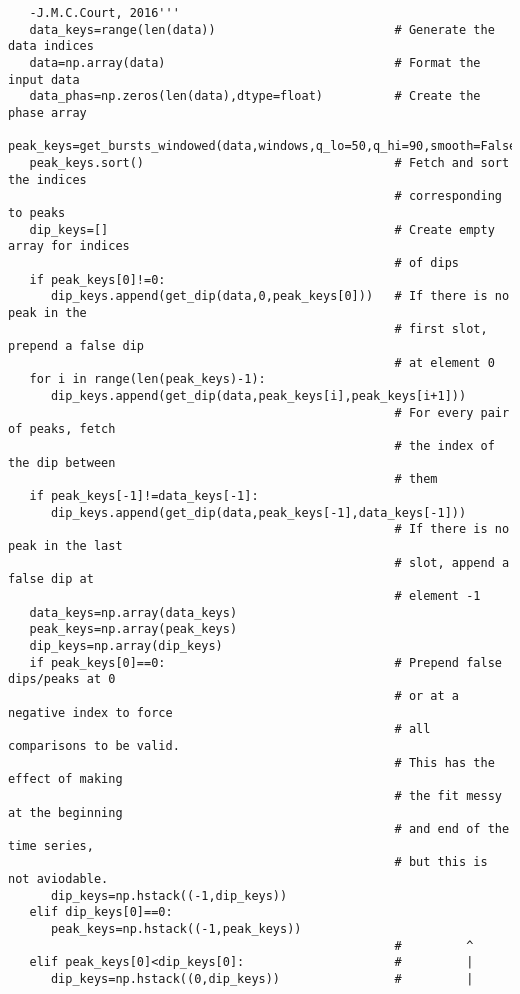 \begin{verbatim}
   -J.M.C.Court, 2016'''
   data_keys=range(len(data))                         # Generate the data indices
   data=np.array(data)                                # Format the input data
   data_phas=np.zeros(len(data),dtype=float)          # Create the phase array
   peak_keys=get_bursts_windowed(data,windows,q_lo=50,q_hi=90,smooth=False)
   peak_keys.sort()                                   # Fetch and sort the indices
                                                      # corresponding to peaks
   dip_keys=[]                                        # Create empty array for indices
                                                      # of dips
   if peak_keys[0]!=0:
      dip_keys.append(get_dip(data,0,peak_keys[0]))   # If there is no peak in the
                                                      # first slot, prepend a false dip
                                                      # at element 0
   for i in range(len(peak_keys)-1):
      dip_keys.append(get_dip(data,peak_keys[i],peak_keys[i+1]))
                                                      # For every pair of peaks, fetch
                                                      # the index of the dip between
                                                      # them
   if peak_keys[-1]!=data_keys[-1]:
      dip_keys.append(get_dip(data,peak_keys[-1],data_keys[-1]))
                                                      # If there is no peak in the last
                                                      # slot, append a false dip at
                                                      # element -1
   data_keys=np.array(data_keys)
   peak_keys=np.array(peak_keys)
   dip_keys=np.array(dip_keys)
   if peak_keys[0]==0:                                # Prepend false dips/peaks at 0 
                                                      # or at a negative index to force
                                                      # all comparisons to be valid.
                                                      # This has the effect of making
                                                      # the fit messy at the beginning
                                                      # and end of the time series,
                                                      # but this is not aviodable.
      dip_keys=np.hstack((-1,dip_keys))
   elif dip_keys[0]==0:
      peak_keys=np.hstack((-1,peak_keys))                             
                                                      #         ^
   elif peak_keys[0]<dip_keys[0]:                     #         |
      dip_keys=np.hstack((0,dip_keys))                #         |

\end{verbatim}
